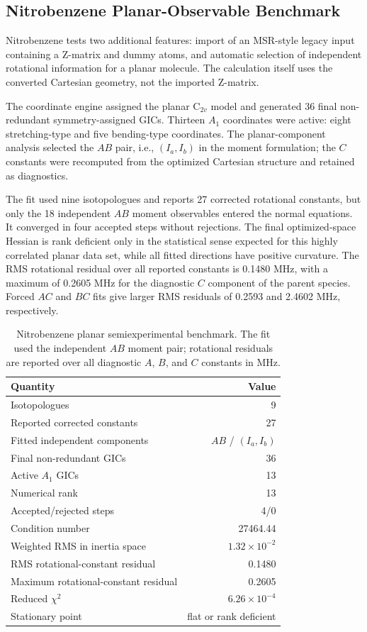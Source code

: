 \documentclass[journal=jctcce,manuscript=article,maxauthors=999]{achemso}
\begin{document}
\subsection{Nitrobenzene Planar-Observable Benchmark}

Nitrobenzene tests two additional features: import of an MSR-style legacy input
containing a Z-matrix and dummy atoms, and automatic selection of independent
rotational information for a planar molecule. The calculation itself uses the
converted Cartesian geometry, not the imported Z-matrix.

The coordinate engine assigned the planar C$_{2v}$ model and generated 36 final
non-redundant symmetry-assigned GICs. Thirteen $A_1$ coordinates were active:
eight stretching-type and five bending-type coordinates. The planar-component
analysis selected the $AB$ pair, i.e., $(I_a,I_b)$ in the moment formulation;
the $C$ constants were recomputed from the optimized Cartesian structure and
retained as diagnostics.

The fit used nine isotopologues and reports 27 corrected rotational constants,
but only the 18 independent $AB$ moment observables entered the normal
equations. It converged in four accepted steps without rejections. The final
optimized-space Hessian is rank deficient only in the statistical sense
expected for this highly correlated planar data set, while all fitted
directions have positive curvature. The RMS rotational residual over all
reported constants is 0.1480 MHz, with a maximum of 0.2605 MHz for the
diagnostic $C$ component of the parent species. Forced $AC$ and $BC$ fits give
larger RMS residuals of 0.2593 and 2.4602 MHz, respectively.

\begin{table}
\caption{Nitrobenzene planar semiexperimental benchmark. The fit used the independent $AB$ moment pair; rotational residuals are reported over all diagnostic $A$, $B$, and $C$ constants in MHz.}
\label{tab:nitrobenzene-fit}
\begin{tabular}{lr}
\toprule
Quantity & Value \\
\midrule
Isotopologues & 9 \\
Reported corrected constants & 27 \\
Fitted independent components & $AB$ / $(I_a,I_b)$ \\
Final non-redundant GICs & 36 \\
Active $A_1$ GICs & 13 \\
Numerical rank & 13 \\
Accepted/rejected steps & 4/0 \\
Condition number & 27464.44 \\
Weighted RMS in inertia space & $1.32\times10^{-2}$ \\
RMS rotational-constant residual & 0.1480 \\
Maximum rotational-constant residual & 0.2605 \\
Reduced $\chi^2$ & $6.26\times10^{-4}$ \\
Stationary point & flat or rank deficient \\
\bottomrule
\end{tabular}
\end{table}
\end{document}
